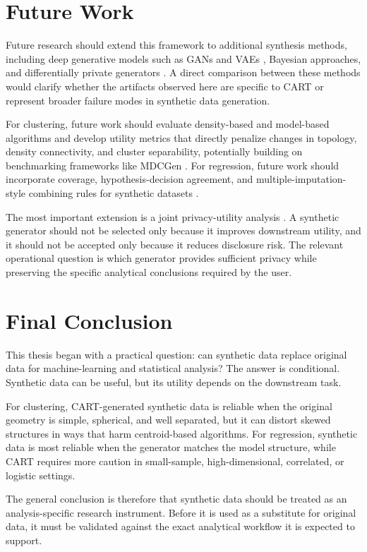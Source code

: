 \section{Future Work}
\label{sec:general-future-work}

Future research should extend this framework to additional synthesis methods, including deep generative models such as GANs and VAEs \cite{jordon2018}, Bayesian approaches, and differentially private generators \cite{dwork2006, bellovin2019}. A direct comparison between these methods would clarify whether the artifacts observed here are specific to CART \cite{nowok2016} or represent broader failure modes in synthetic data generation.

For clustering, future work should evaluate density-based and model-based algorithms and develop utility metrics that directly penalize changes in topology, density connectivity, and cluster separability, potentially building on benchmarking frameworks like MDCGen \cite{iglesias2019}. For regression, future work should incorporate coverage, hypothesis-decision agreement, and multiple-imputation-style combining rules for synthetic datasets \cite{rubin1987, reiter2003}.

The most important extension is a joint privacy-utility analysis \cite{snoke2018, qian2024}. A synthetic generator should not be selected only because it improves downstream utility, and it should not be accepted only because it reduces disclosure risk. The relevant operational question is which generator provides sufficient privacy while preserving the specific analytical conclusions required by the user.

\section{Final Conclusion}
\label{sec:general-final-conclusion}

This thesis began with a practical question: can synthetic data replace original data for machine-learning and statistical analysis? The answer is conditional. Synthetic data can be useful, but its utility depends on the downstream task.

For clustering, CART-generated synthetic data is reliable when the original geometry is simple, spherical, and well separated, but it can distort skewed structures in ways that harm centroid-based algorithms. For regression, synthetic data is most reliable when the generator matches the model structure, while CART requires more caution in small-sample, high-dimensional, correlated, or logistic settings.

The general conclusion is therefore that synthetic data should be treated as an analysis-specific research instrument. Before it is used as a substitute for original data, it must be validated against the exact analytical workflow it is expected to support.
